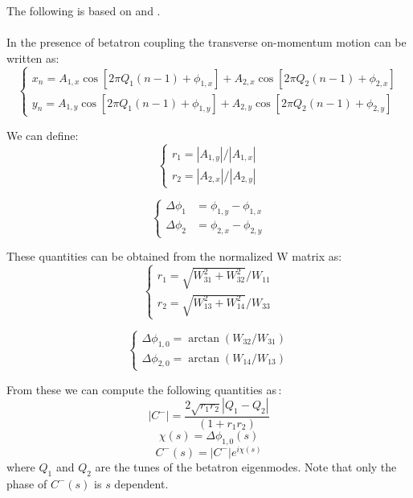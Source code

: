 The following is based on \cite{luo2004phase} and \cite{Jones:2020hhl}.
~\\~\\
In the presence of betatron coupling the transverse on-momentum motion can be written as:
\begin{equation}
\left\{\begin{array}{l}
x_n=A_{1, x} \cos \left[2 \pi Q_1(n-1)+\phi_{1, x}\right]+A_{2, x} \cos \left[2 \pi Q_2(n-1)+\phi_{2, x}\right] \\
y_n=A_{1, y} \cos \left[2 \pi Q_1(n-1)+\phi_{1, y}\right]+A_{2, y} \cos \left[2 \pi Q_2(n-1)+\phi_{2, y}\right]
\end{array}\right.
\end{equation}

We can define:
\begin{equation}
\left\{\begin{array}{l}
r_1=\left|A_{1, y}\right| /\left|A_{1, x}\right| \\
r_2=\left|A_{2, x}\right| /\left|A_{2, y}\right|
\end{array}\right.
\end{equation}

\begin{equation}
\left\{\begin{aligned}
\Delta \phi_1 & =\phi_{1, y}-\phi_{1, x} \\
\Delta \phi_2 & =\phi_{2, x}-\phi_{2, y}
\end{aligned}\right.
\end{equation}

These quantities can be obtained from the normalized W matrix as:
\begin{equation}
\left\{\begin{array}{l}
r_1=\sqrt{W_{31}^2+W_{32}^2} / W_{11} \\
r_2=\sqrt{W_{13}^2+W_{14}^2} / W_{33}
\end{array}\right.
\end{equation}

\begin{equation}
\left\{\begin{array}{l}
\Delta \phi_{1,0}=\arctan \left(W_{32} / W_{31}\right) \\
\Delta \phi_{2,0}=\arctan \left(W_{14} / W_{13}\right)
\end{array}\right.
\end{equation}

From these we can compute the following quantities as\,\cite{Jones:2020hhl}:
\begin{equation}
\left|C^{-}\right|=\frac{2 \sqrt{r_1 r_2}\left|Q_1-Q_2\right|}{\left(1+r_1 r_2\right)}
\label{eq:cmin}
\end{equation}
\begin{equation}
\chi(s) = \Delta \phi_{1,0}(s)
\end{equation}
\begin{equation}
C^-(s) = \left|C^{-}\right|e^{i\chi(s)}
\end{equation}
where $Q_1$ and $Q_2$ are the tunes of the betatron eigenmodes. Note that only the phase of $C^-(s)$ is $s$ dependent.

